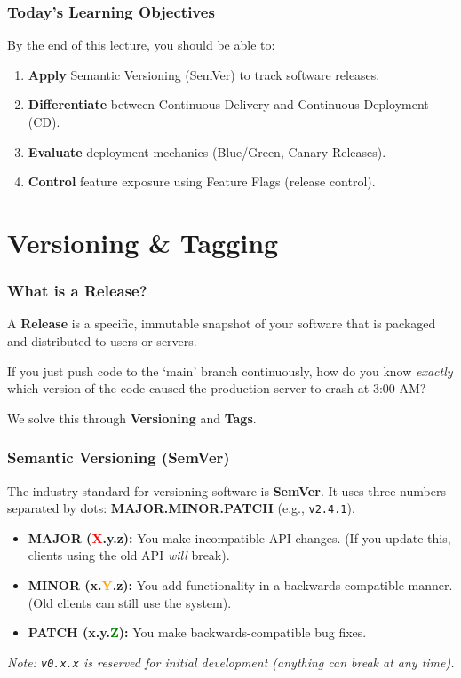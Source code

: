\documentclass[xcolor=table]{beamer}
\begin{document}
\begin{frame}
    \frametitle{Today's Learning Objectives}
    By the end of this lecture, you should be able to:
    \begin{enumerate}
        \item \textbf{Apply} Semantic Versioning (SemVer) to track software releases.
        \item \textbf{Differentiate} between Continuous Delivery and Continuous Deployment (CD).
        \item \textbf{Evaluate} deployment mechanics (Blue/Green, Canary Releases).
        \item \textbf{Control} feature exposure using Feature Flags (release control).
    \end{enumerate}
\end{frame}

\section{Versioning \& Tagging}

\begin{frame}
    \frametitle{What is a Release?}
    A \textbf{Release} is a specific, immutable snapshot of your software that is packaged and distributed to users or servers.
    
    \vspace{0.3cm}
    If you just push code to the `main' branch continuously, how do you know \textit{exactly} which version of the code caused the production server to crash at 3:00 AM?
    
    \vspace{0.3cm}
    We solve this through \textbf{Versioning} and \textbf{Tags}.
\end{frame}

\begin{frame}
    \frametitle{Semantic Versioning (SemVer)}
    The industry standard for versioning software is \textbf{SemVer}. It uses three numbers separated by dots: \textbf{MAJOR.MINOR.PATCH} (e.g., \texttt{v2.4.1}).
    
    \vspace{0.3cm}
    \begin{itemize}
        \item \textbf{MAJOR (\textcolor{red}{X}.y.z):} You make incompatible API changes. (If you update this, clients using the old API \textit{will} break).
        \item \textbf{MINOR (x.\textcolor{orange}{Y}.z):} You add functionality in a backwards-compatible manner. (Old clients can still use the system).
        \item \textbf{PATCH (x.y.\textcolor{green}{Z}):} You make backwards-compatible bug fixes.
    \end{itemize}

    \vspace{0.2cm}
    \textit{Note: \texttt{v0.x.x} is reserved for initial development (anything can break at any time).}
\end{frame}
\end{document}
